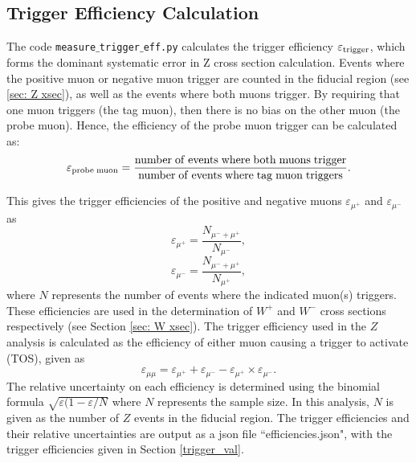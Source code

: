 \documentclass[a4paper]{article}
\begin{document}
\subsection{Trigger Efficiency Calculation} \label{sec: Z trigger efficiency}
The code \texttt{measure$\_$trigger$\_$eff.py} calculates the trigger efficiency $\varepsilon_{\rm trigger}$, which forms the dominant systematic error in Z cross section calculation. 
Events where the positive muon or negative muon trigger are counted in the fiducial region (see \ref{sec: Z xsec}), as well as the events where both muons trigger. 
By requiring that one muon triggers (the tag muon), then there is no bias on the other muon (the probe muon). Hence, the efficiency of the probe muon trigger can be calculated as:
\begin{equation}
{\varepsilon}_{{\rm probe \;  muon}} = \frac{{\rm number \; of \; events \; where \; both \; muons \; trigger}}{{\rm number \; of \; events \; where \; tag \; muon \; triggers}}.
\end{equation}

This gives the trigger efficiencies of the positive and negative muons $\varepsilon_{\mu^+}$ and $\varepsilon_{\mu^-}$ as
\begin{equation}
    \varepsilon_{\mu^+} = \frac{N_{\mu^- + \mu^+}}{N_{\mu^-}},
    \label{eq: mup_eff}
\end{equation}
\begin{equation}
    \varepsilon_{\mu^-} = \frac{N_{\mu^- + \mu^+}}{N_{\mu^+}},
    \label{eq: mum_eff}
\end{equation}
where $N$ represents the number of events where the indicated muon(s) triggers. These efficiencies are used in the determination of $W^+$ and $W^-$ cross sections respectively (see Section \ref{sec: W xsec}).
The trigger efficiency used in the $Z$ analysis is calculated as the efficiency of either muon causing a trigger to activate (TOS), given as
\begin{equation}
    \varepsilon_{\mu\mu} = \varepsilon_{\mu^+} + \varepsilon_{\mu^-} - \varepsilon_{\mu^+} \times \varepsilon_{\mu^-}.
    \label{eq: either eff}
\end{equation}
The relative uncertainty on each efficiency is determined using the binomial formula $\sqrt{\varepsilon(1-\varepsilon/N}$ where $N$ represents the sample size. In this analysis, $N$ is given as the number of $Z$ events in the fiducial region.
The trigger efficiencies and their relative uncertainties are output as a json file ``efficiencies.json", with the trigger efficiencies given in Section \ref{trigger_val}.
\end{document}
